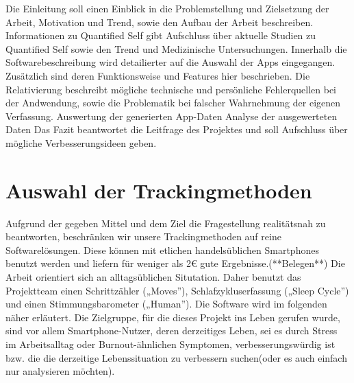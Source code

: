 Die Einleitung soll einen Einblick in die Problemstellung und Zielsetzung der Arbeit, Motivation und Trend, sowie den Aufbau der Arbeit beschreiben.
Informationen zu Quantified Self gibt Aufschluss über aktuelle Studien zu Quantified Self sowie den Trend und Medizinische Untersuchungen.
Innerhalb die Softwarebeschreibung wird detailierter auf die Auswahl der Apps eingegangen. 
Zusätzlich sind deren Funktionsweise und Features hier beschrieben.
Die Relativierung beschreibt mögliche technische und persönliche Fehlerquellen bei der Andwendung, sowie die Problematik bei falscher Wahrnehmung der eigenen Verfassung.
Auswertung der generierten App-Daten
Analyse der ausgewerteten Daten
Das Fazit beantwortet die Leitfrage des Projektes und soll Aufschluss über mögliche Verbesserungsideen geben.

\section{Auswahl der Trackingmethoden}
\label{ch:Einleitung:sec:auswahl-der-trackingmethoden}

Aufgrund der gegeben Mittel und dem Ziel die Fragestellung realitätsnah zu beantworten, beschränken wir unsere Trackingmethoden auf reine Softwarelösungen. 
Diese können mit etlichen handelsüblichen Smartphones benutzt werden und liefern für weniger als 2\euro{} gute Ergebnisse.(**Belegen**) 
Die Arbeit orientiert sich an alltagsüblichen Situtation. 
Daher benutzt das Projektteam einen Schrittzähler („Moves”), Schlafzykluserfassung („Sleep Cycle”) und einen Stimmungsbarometer („Human”).
Die Software wird im folgenden näher erläutert.
Die Zielgruppe, für die dieses Projekt ins Leben gerufen wurde, sind vor allem Smartphone-Nutzer, deren derzeitiges Leben, sei es durch Stress im Arbeitsalltag oder Burnout-ähnlichen Symptomen, verbesserungswürdig ist bzw. die die derzeitige Lebenssituation zu verbessern suchen(oder es auch einfach nur analysieren möchten).  

